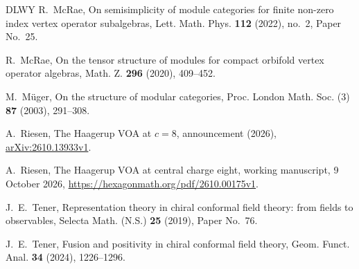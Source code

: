 \documentclass[11pt,reqno]{amsart}
\theoremstyle{definition}\newtheorem{definition}[theorem]{Definition}
\theoremstyle{remark}\newtheorem{remark}[theorem]{Remark}
\numberwithin{equation}{section}
\begin{document}
\begin{thebibliography}{DLWY}
 R.~McRae, On semisimplicity of module categories for finite non-zero index vertex operator subalgebras, Lett. Math. Phys. \textbf{112} (2022), no.~2, Paper No.~25.

 R.~McRae, On the tensor structure of modules for compact orbifold vertex operator algebras, Math. Z. \textbf{296} (2020), 409--452.

 M.~M\"uger, On the structure of modular categories, Proc. London Math. Soc. (3) \textbf{87} (2003), 291--308.

 A.~Riesen, The Haagerup VOA at $c=8$, announcement (2026), \href{https://arxiv.org/abs/2610.13933v1}{arXiv:2610.13933v1}.

 A.~Riesen, The Haagerup VOA at central charge eight, working manuscript, 9 October 2026, \url{https://hexagonmath.org/pdf/2610.00175v1}.

 J.~E.~Tener, Representation theory in chiral conformal field theory: from fields to observables, Selecta Math. (N.S.) \textbf{25} (2019), Paper No.~76.

 J.~E.~Tener, Fusion and positivity in chiral conformal field theory, Geom. Funct. Anal. \textbf{34} (2024), 1226--1296.
\end{thebibliography}
\end{document}
